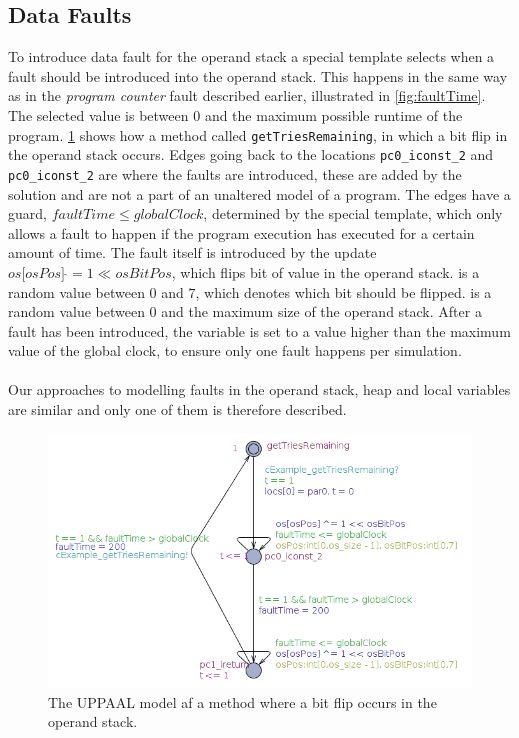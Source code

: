 \subsection{Data Faults}
To introduce data fault for the operand stack a special template selects when a fault should be introduced into the operand stack. This happens in the same way as in the \textit{program counter} fault described earlier, illustrated in \cref{fig:faultTime}. The selected value is between $0$ and the maximum possible runtime of the program. \cref{fig:opstackFlip} shows how a method called \texttt{getTriesRemaining}, in which a bit flip in the operand stack occurs. Edges going back to the locations \texttt{pc0\_iconst\_2} and \texttt{pc0\_iconst\_2} are where the faults are introduced, these are added by the solution and are not a part of an unaltered model of a program. The edges have a guard, $faultTime \leq globalClock$, determined by the special template, which only allows a fault to happen if the program execution has executed for a certain amount of time. The fault itself is introduced by the update $os\lbrack osPos \rbrack\:\hat{}= 1 \ll osBitPos$, which flips bit  of value  in the operand stack.  is a random value between $0$ and $7$, which denotes which bit should be flipped.  is a random value between $0$ and the maximum size of the operand stack. After a fault has been introduced, the variable  is set to a value higher than the maximum value of the global clock, to ensure only one fault happens per simulation.\\\\
Our approaches to modelling faults in the operand stack, heap and local variables are similar and only one of them is therefore described.
\begin{figure}[H]
\centering
\includegraphics[width=\textwidth]{figures/reportExamples/opstackRewrite.png}
\caption{The UPPAAL model af a method where a bit flip occurs in the operand stack.}
\label{fig:opstackFlip}
\end{figure}
